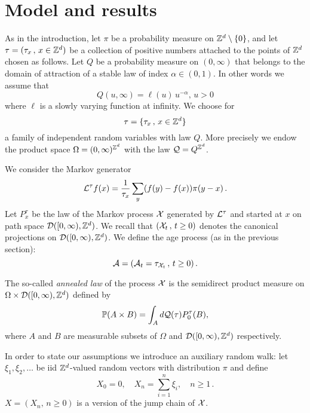 \section{Model and results}
\label{sec:mod}
\setcounter{equation}{0}


As in the introduction, let $\pi$ be a probability measure on ${\mathbb Z}^d\setminus\{0\}$, and let 
$\tau=(\tau_x\,,\, x\in{\mathbb Z}^d)$ be a collection of 
positive numbers attached to the points of ${\mathbb Z}^d$ 
chosen as follows.
Let $Q$ be a probability measure on $(0,\infty)$ that belongs to the domain of attraction of a 
stable law of index $\alpha\in (0,1)$. In other words we assume that 
\begin{equation}\label{eq:tail}
 Q(u,\infty)=\ell(u)\,u^{-\alpha},\,u>0
\end{equation}
where $\ell$ is a slowly varying function at infinity. 
We choose for 
\begin{equation}\label{eq:tau}
\tau=\{\tau_x\,,\, x\in\Z^d\} 
\end{equation} 
a family of independent random variables 
with law $Q$. More precisely we endow the product space $\Omega=(0,\infty)^{{\mathbb Z}^d}$ 
with the law ${\cal Q}=Q^{{\mathbb Z}^d}$.

We consider the Markov generator 
\begin{equation}\label{eq:df}
 {\cal L}^\tau f(x)=\frac 1{\tau_x}\sum_y (f(y)-f(x))\pi(y-x)\,.
\end{equation} 
Let $P^\tau_x$ be the law 
of the Markov process ${\cal X}$ generated by ${\cal L}^\tau$ and started at $x$ 
on path space ${\cal D}([0,\infty),{\mathbb Z}^d)$. 
We recall that $({\cal X}_t\,,\, t\geq 0)$ denotes the canonical 
projections on ${\cal D}([0,\infty),{\mathbb Z}^d)$. 
We define the age process (as in the previous section): 
\begin{equation}\label{eq:en}
 \E=(\E_t=\tau_{\X_t}\,,\,t\geq 0)\,.
\end{equation}



The so-called {\it annealed law} of the process ${\cal X}$ 
is the semidirect product measure on $\Omega\times{\cal D}([0,\infty),{\mathbb Z}^d)$ 
defined by 
\begin{equation}\label{eq:joint}
\P(A\times B)=\int_A d\Q(\tau) P^\tau_0(B),
\end{equation} 
where $A$ and $B$ are measurable subsets of $\Omega$ and ${\cal D}([0,\infty),{\mathbb Z}^d)$ 
respectively. 

In order to state our assumptions we introduce an auxiliary random walk:  
let $\xi_1,\xi_2,\ldots$ be iid ${\mathbb Z}^d$-valued 
random vectors with distribution $\pi$ and define 
\begin{equation}\label{eq:rw}
 X_0=0,\quad X_n=\sum_{i=1}^n\xi_i,\quad n\geq1\,.
\end{equation}
$X=(X_n,\,n\geq0)$ is a version of the jump chain of ${\cal X}$.

